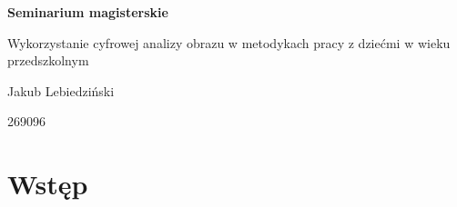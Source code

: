 \documentclass{article}
\begin{document}

\centerline{\textbf{\Large Seminarium magisterskie}}
\vspace{10mm}
{\Large Wykorzystanie cyfrowej analizy obrazu w metodykach pracy z dziećmi w wieku przedszkolnym}

\vspace{10mm}
\centerline{\large Jakub Lebiedziński} 
\vspace{1mm}
\centerline{\normalsize {269096}} 
\vspace{5mm} 

\linespread{1.3} %
\large %

\section*{Wstęp}
\end{document}
